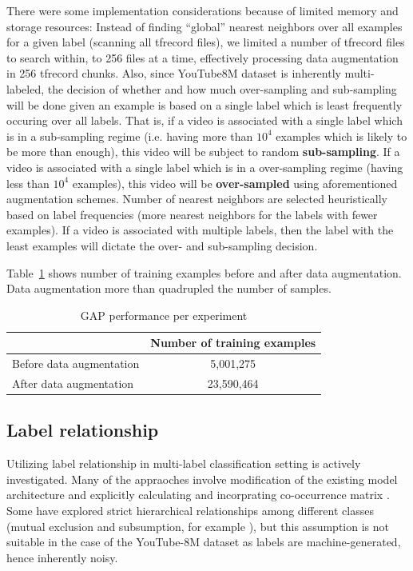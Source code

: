 \documentclass[runningheads]{llncs}
\begin{document}
There were some implementation considerations because of limited memory and storage resources: Instead of finding ``global'' nearest neighbors over all examples for a given label (scanning all tfrecord files), we limited a number of tfrecord files to search within, to 256 files at a time, effectively processing data augmentation in 256 tfrecord chunks.
Also, since YouTube8M dataset is inherently multi-labeled, the decision of whether and how much over-sampling and sub-sampling will be done given an example is based on a single label which is least frequently occuring over all labels.
That is, if a video is associated with a single label which is in a sub-sampling regime (i.e. having more than $10^4$ examples which is likely to be more than enough), this video will be subject to random \textbf{sub-sampling}.
If a video is associated with a single label which is in a over-sampling regime (having less than $10^4$ examples), this video will be \textbf{over-sampled} using aforementioned augmentation schemes.
Number of nearest neighbors are selected heuristically based on label frequencies (more nearest neighbors for the labels with fewer examples).
If a video is associated with multiple labels, then the label with the least examples will dictate the over- and sub-sampling decision.

Table~\ref{tab:aug_num_samples} shows number of training examples before and after data augmentation.
Data augmentation more than quadrupled the number of samples.

\begin{table}[h!]
  \begin{center}
    \caption{GAP performance per experiment}
    \label{tab:aug_num_samples}

    \begin{tabular}{ l | c }
       & Number of training examples  \\
    \hline
    \hline
      Before data augmentation & 5,001,275  \\
    \hline
      After data augmentation & 23,590,464 \\
    \end{tabular}
  \end{center}
\end{table}

\subsection{Label relationship} \label{sub:label_relationship}
Utilizing label relationship in multi-label classification setting is actively investigated.
Many of the appraoches involve modification of the existing model architecture and explicitly calculating and incorprating co-occurrence matrix \cite{rabinovich2007}\cite{bengio2013}.
Some have explored strict hierarchical relationships among different classes (mutual exclusion and subsumption, for example \cite{deng2014}), but this assumption is not suitable in the case of the YouTube-8M dataset as labels are machine-generated, hence inherently noisy.
\end{document}
